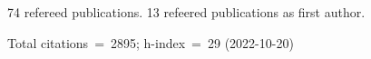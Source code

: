 74 refereed publications. 13 refeered publications as first author.

Total citations~=~2895; h-index~=~29 (2022-10-20)